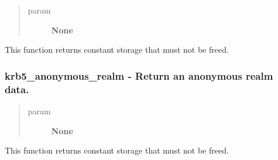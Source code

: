 \documentclass[letterpaper,10pt,english]{sphinxmanual}
\begin{document}
\begin{fulllineitems}
\label{appdev/refs/api/krb5_anonymous_principal:krb5_anonymous_principal}
\end{fulllineitems}

\begin{quote}\begin{description}
\item[{param}] \leavevmode
\textbf{None}

\end{description}\end{quote}

This function returns constant storage that must not be freed.




{\hyperref[appdev/refs/macros/KRB5_ANONYMOUS_PRINCSTR:KRB5_ANONYMOUS_PRINCSTR]{}}




\subsubsection{krb5\_anonymous\_realm -  Return an anonymous realm data.}
\label{appdev/refs/api/krb5_anonymous_realm::doc}\label{appdev/refs/api/krb5_anonymous_realm:krb5-anonymous-realm-return-an-anonymous-realm-data}

\begin{fulllineitems}
\label{appdev/refs/api/krb5_anonymous_realm:krb5_anonymous_realm}
\end{fulllineitems}

\begin{quote}\begin{description}
\item[{param}] \leavevmode
\textbf{None}

\end{description}\end{quote}

This function returns constant storage that must not be freed.




{\hyperref[appdev/refs/macros/KRB5_ANONYMOUS_REALMSTR:KRB5_ANONYMOUS_REALMSTR]{}}
\end{document}
